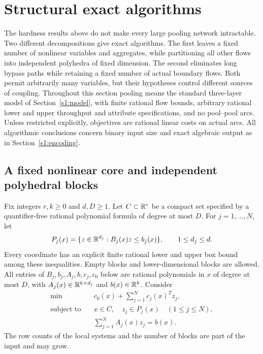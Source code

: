 \section{Structural exact algorithms}\label{s4:structural}

The hardness results above do not make every large pooling network
intractable. Two different decompositions give exact algorithms. The
first leaves a fixed number of nonlinear variables and aggregates, while
partitioning all other flows into independent polyhedra of fixed
dimension. The second eliminates long bypass paths while retaining a
fixed number of actual boundary flows. Both permit arbitrarily many
variables, but their hypotheses control different sources of coupling.
Throughout this section pooling means the standard three-layer model of
Section~\ref{s1:model}, with finite rational flow bounds, arbitrary
rational lower and upper throughput and attribute specifications, and
no pool--pool arcs. Unless restricted explicitly, objectives are rational
linear costs on actual arcs. All algorithmic conclusions concern binary
input size and exact algebraic output as in Section~\ref{s1:encoding}.

\subsection{A fixed nonlinear core and independent polyhedral blocks}
\label{s4:core-model}

Fix integers $r,k\ge0$ and $d,D\ge1$. Let $C\subset\mathbb R^r$ be a compact
set specified by a quantifier-free rational polynomial formula of degree
at most $D$. For $j=1,\ldots,N$, let
\[
 P_j(x)=\{z\in\mathbb R^{d_j}:B_j(x)z\le b_j(x)\},\qquad 1\le d_j\le d.
\]
Every coordinate has an explicit finite rational lower and upper box
bound among these inequalities. Empty blocks and lower-dimensional
blocks are allowed. All entries of $B_j,b_j,A_j,b,c_j,c_0$ below are
rational polynomials in $x$ of degree at most $D$, with
$A_j(x)\in\mathbb R^{k\times d_j}$ and $b(x)\in\mathbb R^k$. Consider
\begin{equation}
 \begin{aligned}
 \min\quad &c_0(x)+\sum_{j=1}^N c_j(x)^Tz_j,\\
 \text{subject to}\quad &x\in C,\quad z_j\in P_j(x)\quad(1\le j\le N),\\
 &\sum_{j=1}^N A_j(x)z_j=b(x).
 \end{aligned}\label{s4:block-model}
\end{equation}
The row counts of the local systems and the number of blocks are part
of the input and may grow.

